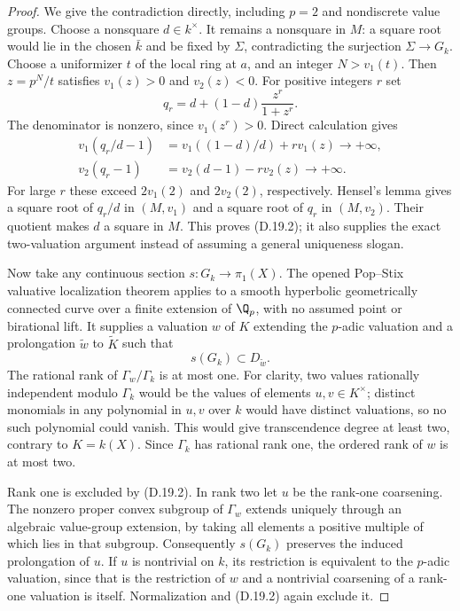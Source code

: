 \begin{proof}
We give the contradiction directly, including $p=2$ and nondiscrete
value groups. Choose a nonsquare $d\in k^\times$. It remains a
nonsquare in $M$: a square root would lie in the chosen $\bar k$
and be fixed by $\Sigma$, contradicting the surjection
$\Sigma\to G_k$. Choose a uniformizer $t$ of the local ring at
$a$, and an integer $N>v_1(t)$. Then $z=p^N/t$ satisfies
$v_1(z)>0$ and $v_2(z)<0$. For positive integers $r$ set
\[
 q_r=d+(1-d)\frac{z^r}{1+z^r}.
\]
The denominator is nonzero, since $v_1(z^r)>0$. Direct calculation gives
\begin{align*}
 v_1(q_r/d-1)&=v_1((1-d)/d)+r v_1(z)\longrightarrow+\infty,\\
 v_2(q_r-1)&=v_2(d-1)-r v_2(z)\longrightarrow+\infty.
\end{align*}
For large $r$ these exceed $2v_1(2)$ and $2v_2(2)$, respectively.
Hensel's lemma gives a square root of $q_r/d$ in $(M,v_1)$ and
a square root of $q_r$ in $(M,v_2)$. Their quotient makes $d$ a
square in $M$. This proves (D.19.2); it also supplies the exact
two-valuation argument instead of assuming a general uniqueness slogan.

Now take any continuous section $s:G_k\to\pi_1(X)$.
The opened Pop--Stix valuative localization theorem
\citep[Theorem~26 in the author preprint]{D_PopStix2017}
applies to a smooth hyperbolic geometrically connected curve over
a finite extension of $\Q_p$, with no assumed point or birational
lift. It supplies a valuation $w$ of $K$ extending the $p$-adic
valuation and a prolongation $\widetilde w$ to $\widetilde K$ such that
\[
                    s(G_k)\subset D_{\widetilde w}.
\]
The rational rank of $\Gamma_w/\Gamma_k$ is at most one.
For clarity, two values rationally independent modulo $\Gamma_k$
would be the values of elements $u,v\in K^\times$; distinct monomials
in any polynomial in $u,v$ over $k$ would have distinct valuations,
so no such polynomial could vanish. This would give transcendence
degree at least two, contrary to $K=k(X)$. Since $\Gamma_k$ has
rational rank one, the ordered rank of $w$ is at most two.

Rank one is excluded by (D.19.2). In rank two let $u$ be the
rank-one coarsening. The nonzero proper convex subgroup of
$\Gamma_w$ extends uniquely through an algebraic value-group
extension, by taking all elements a positive multiple of which
lies in that subgroup. Consequently $s(G_k)$ preserves the induced
prolongation of $u$. If $u$ is nontrivial on $k$, its restriction
is equivalent to the $p$-adic valuation, since that is the restriction
of $w$ and a nontrivial coarsening of a rank-one valuation is itself.
Normalization and (D.19.2) again exclude it.


\end{proof}
